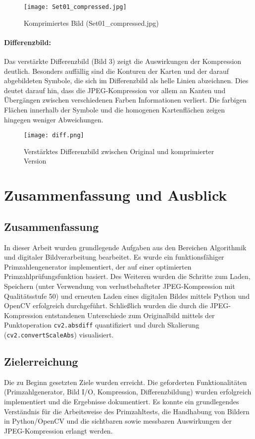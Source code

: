 \documentclass[titlepage]{article}
\begin{document}
\begin{figure}[H]
    \centering
    \texttt{[image: Set01\_compressed.jpg]}
    \caption{Komprimiertes Bild (Set01\_compressed.jpg)}
    \label{fig:compressed}
\end{figure}

\paragraph{Differenzbild:}
Das verstärkte Differenzbild (Bild 3) zeigt die Auswirkungen der Kompression deutlich. Besonders auffällig sind die Konturen der Karten und der darauf abgebildeten Symbole, die sich im Differenzbild als helle Linien abzeichnen. Dies deutet darauf hin, dass die JPEG-Kompression vor allem an Kanten und Übergängen zwischen verschiedenen Farben Informationen verliert. Die farbigen Flächen innerhalb der Symbole und die homogenen Kartenflächen zeigen hingegen weniger Abweichungen.

\begin{figure}[H]
    \centering
    \texttt{[image: diff.png]}
    \caption{Verstärktes Differenzbild zwischen Original und komprimierter Version}
    \label{fig:difference}
\end{figure}

\section{Zusammenfassung und Ausblick}

\subsection{Zusammenfassung}
In dieser Arbeit wurden grundlegende Aufgaben aus den Bereichen Algorithmik und digitaler Bildverarbeitung bearbeitet. Es wurde ein funktionsfähiger Primzahlengenerator implementiert, der auf einer optimierten Primzahlprüfungsfunktion basiert. Des Weiteren wurden die Schritte zum Laden, Speichern (unter Verwendung von verlustbehafteter JPEG-Kompression mit Qualitätsstufe 50) und erneuten Laden eines digitalen Bildes mittels Python und OpenCV erfolgreich durchgeführt. Schließlich wurden die durch die JPEG-Kompression entstandenen Unterschiede zum Originalbild mittels der Punktoperation \texttt{cv2.absdiff} quantifiziert und durch Skalierung (\texttt{cv2.convertScaleAbs}) visualisiert.

\subsection{Zielerreichung}
Die zu Beginn gesetzten Ziele wurden erreicht. Die geforderten Funktionalitäten (Primzahlgenerator, Bild I/O, Kompression, Differenzbildung) wurden erfolgreich implementiert und die Ergebnisse dokumentiert. Es konnte ein grundlegendes Verständnis für die Arbeitsweise des Primzahltests, die Handhabung von Bildern in Python/OpenCV und die sichtbaren sowie messbaren Auswirkungen der JPEG-Kompression erlangt werden.
\end{document}

